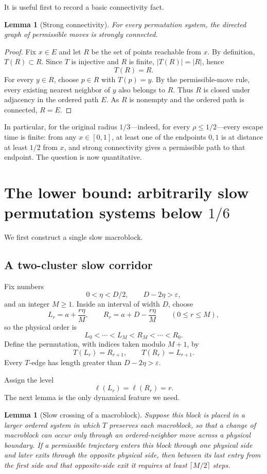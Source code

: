 \documentclass[11pt]{article}
\newtheorem{lemma}[theorem]{Lemma}
\newcommand{\eps}{\varepsilon}
\begin{document}
It is useful first to record a basic connectivity fact.

\begin{lemma}[Strong connectivity]\label{lem:strong-connectivity}
For every permutation system, the directed graph of permissible moves is strongly connected.
\end{lemma}

\begin{proof}
Fix $x\in E$ and let $R$ be the set of points reachable from $x$. By definition, $T(R)\subset R$. Since $T$ is injective and $R$ is finite, $|T(R)|=|R|$, hence
\[
T(R)=R.
\]
For every $y\in R$, choose $p\in R$ with $T(p)=y$. By the permissible-move rule, every existing nearest neighbor of $y$ also belongs to $R$. Thus $R$ is closed under adjacency in the ordered path $E$. As $R$ is nonempty and the ordered path is connected, $R=E$.
\end{proof}

In particular, for the original radius $1/3$---indeed, for every $\rho\le1/2$---every escape time is finite: from any $x\in[0,1]$, at least one of the endpoints $0,1$ is at distance at least $1/2$ from $x$, and strong connectivity gives a permissible path to that endpoint. The question is now quantitative.

\section{The lower bound: arbitrarily slow permutation systems below $1/6$}

We first construct a single slow macroblock.

\subsection{A two-cluster slow corridor}

Fix numbers
\[
0<\eta<D/2,\qquad D-2\eta>\eps,
\]
and an integer $M\ge1$. Inside an interval of width $D$, choose
\[
L_r=a+\frac{r\eta}{M},\qquad
R_r=a+D-\frac{r\eta}{M}
\qquad (0\le r\le M),
\]
so the physical order is
\[
L_0<\cdots<L_M<R_M<\cdots<R_0.
\]
Define the permutation, with indices taken modulo $M+1$, by
\[
T(L_r)=R_{r+1},\qquad T(R_r)=L_{r+1}.
\]
Every $T$-edge has length greater than $D-2\eta>\eps$.

Assign the level
\[
\ell(L_r)=\ell(R_r)=r.
\]
The next lemma is the only dynamical feature we need.

\begin{lemma}[Slow crossing of a macroblock]\label{lem:slow-block}
Suppose this block is placed in a larger ordered system in which $T$ preserves each macroblock, so that a change of macroblock can occur only through an ordered-neighbor move across a physical boundary. If a permissible trajectory enters this block through one physical side and later exits through the opposite physical side, then between its last entry from the first side and that opposite-side exit it requires at least $\lceil M/2\rceil$ steps.
\end{lemma}
\end{document}
